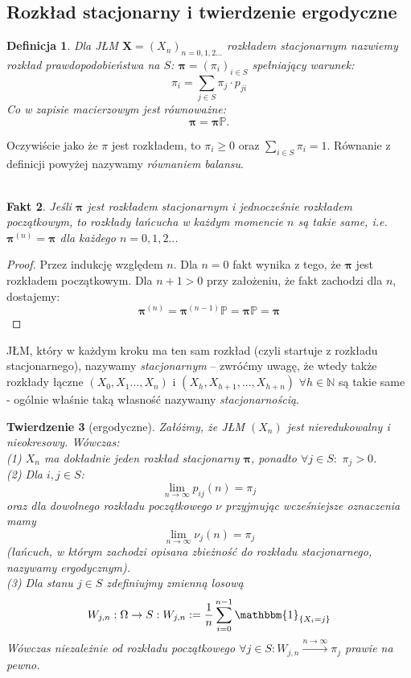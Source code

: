 \documentclass[a4paper]{article}
\theoremstyle{defn}
\newtheorem{defn}{Definicja}[subsection]
\theoremstyle{theorem}
\newtheorem{theorem}[defn]{Twierdzenie}
\theoremstyle{lemma}
\theoremstyle{cor}
\theoremstyle{fact}
\newtheorem{fact}[defn]{Fakt}
\begin{document}
\subsection{Rozkład stacjonarny i twierdzenie ergodyczne}
\label{sect2.2}
\begin{defn}\label{defn2.2.1}
Dla JŁM $\boldsymbol{X} = (X_n)_{n = 0,1,2...}$ \textit{rozkładem stacjonarnym} nazwiemy rozkład prawdopodobieństwa na $S$: $\boldsymbol{\pi} = (\pi_i)_{i \in S}$ spełniający warunek:
$$\pi_i = \sum\limits_{j \in S} \pi_j \cdot p_{ji}$$
Co w zapisie macierzowym jest równoważne:
$$\boldsymbol{\pi} = \boldsymbol{\pi} \mathbb{P}.$$
\end{defn}
Oczywiście jako że $\pi$ jest rozkładem, to $\pi_i \geq 0$ oraz $\sum\limits_{i \in S} \pi_i = 1$. Równanie z definicji powyżej nazywamy \textit{równaniem balansu}.
\\\\
\begin{fact}\label{fact2.2.2}
Jeśli $\boldsymbol{\pi}$ jest rozkładem stacjonarnym i jednocześnie rozkładem początkowym, to rozkłady łańcucha w każdym momencie $n$ są takie same, i.e. $\boldsymbol{\pi}^{(n)} = \boldsymbol{\pi}$ dla każdego $n = 0,1,2..$.
\end{fact}
\begin{proof}
Przez indukcję względem $n$. Dla $n = 0$ fakt wynika z tego, że $\boldsymbol{\pi}$ jest rozkładem początkowym. Dla $n+1>0$ przy założeniu, że fakt zachodzi dla $n$, dostajemy:
$$\boldsymbol{\pi}^{(n)} = \boldsymbol{\pi}^{(n-1)} \mathbb{P} = \boldsymbol{\pi} \mathbb{P} = \boldsymbol{\pi}$$
\end{proof}
JŁM, który w każdym kroku ma ten sam rozkład (czyli startuje z rozkładu stacjonarnego), nazywamy \textit{stacjonarnym} – zwróćmy uwagę, że wtedy także rozkłady łączne $(X_0, X_1 ..., X_n)$ i $(X_h, X_{h+1}, ..., X_{h+n})$ $\forall h \in \mathbb{N}$ są takie same - ogólnie właśnie taką własność nazywamy \textit{stacjonarnością}.
\\
\begin{theorem}[ergodyczne]\label{theorem2.2.3}
Załóżmy, że JŁM $(X_n)$ jest nieredukowalny i nieokresowy. Wówczas:\\
(1) $X_n$ ma dokładnie jeden rozkład stacjonarny $\boldsymbol{\pi}$, ponadto $\forall j \in S:\,\, \pi_j > 0$.
\\
(2) Dla $i,j \in S$: $$\lim\limits_{n \to \infty} p_{ij}(n) = \pi_j$$ oraz dla dowolnego rozkładu początkowego $\nu$ przyjmując wcześniejsze oznaczenia mamy $$\lim\limits_{n \to \infty} \nu_j(n) = \pi_j$$ (łańcuch, w którym zachodzi opisana zbieżność do rozkładu stacjonarnego, nazywamy ergodycznym).
\\
(3) Dla stanu $j \in S$ zdefiniujmy zmienną losową $$W_{j,n}: \Omega \rightarrow S: W_{j,n} :=  \frac{1}{n} \sum\limits_{i = 0}^{n-1} \mathbbm{1}_{\{X_i = j\}}$$
Wówczas niezależnie od rozkładu początkowego $\forall j \in S: W_{j,n} \xrightarrow{{n \rightarrow \infty}} \pi_j$ prawie na pewno.
\end{theorem}
\end{document}
